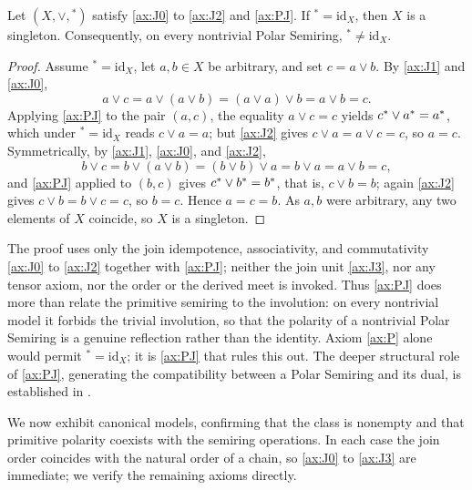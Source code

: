 \begin{proposition}\label{prop:role-PJ}
Let $(X,\vee,{}^{*})$ satisfy \eqref{ax:J0} to \eqref{ax:J2} and
\eqref{ax:PJ}. If ${}^{*} = \mathrm{id}_X$, then $X$ is a singleton.
Consequently, on every nontrivial Polar Semiring, ${}^{*} \neq \mathrm{id}_X$.
\end{proposition}

\begin{proof}
Assume ${}^{*} = \mathrm{id}_X$, let $a,b \in X$ be arbitrary, and set
$c = a \vee b$. By \eqref{ax:J1} and \eqref{ax:J0},
$$
  a \vee c = a \vee (a \vee b) = (a \vee a) \vee b = a \vee b = c.
$$
Applying \eqref{ax:PJ} to the pair $(a,c)$, the equality $a \vee c = c$
yields ${c}^{*} \vee {a}^{*} = {a}^{*}$, which under
${}^{*} = \mathrm{id}_X$ reads $c \vee a = a$; but \eqref{ax:J2} gives
$c \vee a = a \vee c = c$, so $a = c$. Symmetrically, by \eqref{ax:J1},
\eqref{ax:J0}, and \eqref{ax:J2},
$$
  b \vee c = b \vee (a \vee b) = (b \vee b) \vee a = b \vee a = a \vee b = c,
$$
and \eqref{ax:PJ} applied to $(b,c)$ gives ${c}^{*} \vee {b}^{*} =
{b}^{*}$, that is, $c \vee b = b$; again \eqref{ax:J2} gives $c \vee b =
b \vee c = c$, so $b = c$. Hence $a = c = b$. As $a,b$ were arbitrary, any
two elements of $X$ coincide, so $X$ is a singleton.
\end{proof}

The proof uses only the join idempotence, associativity, and commutativity
\eqref{ax:J0} to \eqref{ax:J2} together with \eqref{ax:PJ}; neither the join
unit \eqref{ax:J3}, nor any tensor axiom, nor the order or the derived meet
is invoked. Thus \eqref{ax:PJ} does more than relate the primitive semiring
to the involution: on every nontrivial model it forbids the trivial
involution, so that the polarity of a nontrivial Polar Semiring is a genuine
reflection rather than the identity. Axiom \eqref{ax:P} alone would permit
${}^{*} = \mathrm{id}_X$; it is \eqref{ax:PJ} that rules this out. The deeper
structural role of \eqref{ax:PJ}, generating the compatibility between a
Polar Semiring and its dual, is established in .

We now exhibit canonical models, confirming that the class is nonempty and
that primitive polarity coexists with the semiring operations. In each case
the join order coincides with the natural order of a chain, so
\eqref{ax:J0} to \eqref{ax:J3} are immediate; we verify the remaining
axioms directly.


